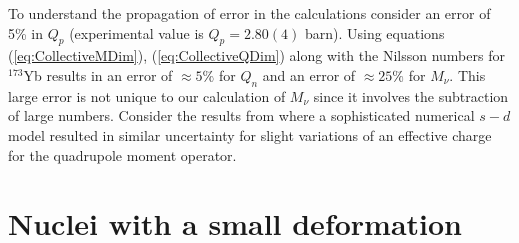 \documentclass[10pt,a4paper, twoside, openright]{report}
\begin{document}
To understand the propagation of error in the calculations consider an error of 5\% in $Q_p$ (experimental value is $Q_p = 2.80(4)$ barn). Using equations  (\ref{eq:CollectiveMDim}), (\ref{eq:CollectiveQDim}) along with the Nilsson numbers for $^{173}$Yb results in an error of $\approx 5\%$ for  $Q_n$  and an error of $\approx 25\%$ for $M_{\nu}$. This large error is not unique to our calculation of $M_{\nu}$ since it involves the subtraction of large numbers. Consider the results from \cite{Brown2016} where a sophisticated numerical $s-d$ model resulted in similar uncertainty for slight variations of an effective charge for the quadrupole moment operator.

\section{Nuclei with a small deformation} \label{sec:Minimal}
\end{document}
